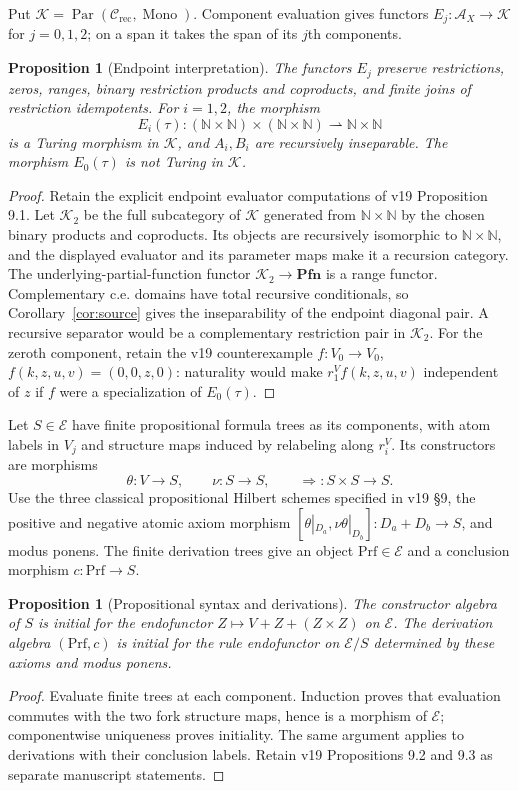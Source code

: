 \documentclass[11pt]{article}
\newtheorem{proposition}[theorem]{Proposition}
\theoremstyle{definition}\newtheorem{definition}[theorem]{Definition}
\newcommand{\N}{\mathbb N}
\newcommand{\Pfn}{\mathbf{Pfn}}
\newcommand{\Par}{\operatorname{Par}}
\newcommand{\A}{\mathcal A}
\newcommand{\E}{\mathcal E}
\begin{document}
Put $\mathcal K=\Par(\mathcal C_{\mathrm{rec}},\operatorname{Mono})$.
Component evaluation gives functors
$E_j:\A_X\to\mathcal K$ for $j=0,1,2$; on a span it takes
the span of its $j$th components.

\begin{proposition}[Endpoint interpretation]\label{prop:fork-endpoints}
The functors $E_j$ preserve restrictions, zeros, ranges, binary
restriction products and coproducts, and finite joins of restriction
idempotents. For $i=1,2$, the morphism
\[
 E_i(\tau):(\N\times\N)\times(\N\times\N)
                  \rightharpoonup\N\times\N
\]
is a Turing morphism in $\mathcal K$, and $A_i,B_i$ are recursively
inseparable. The morphism $E_0(\tau)$ is not Turing in $\mathcal K$.
\end{proposition}
\begin{proof}
Retain the explicit endpoint evaluator computations of v19
Proposition 9.1. Let $\mathcal K_2$ be the full subcategory of
$\mathcal K$ generated from $\N\times\N$ by the chosen binary
products and coproducts. Its objects are recursively isomorphic to
$\N\times\N$, and the displayed evaluator and its parameter maps
make it a recursion category. The underlying-partial-function
functor $\mathcal K_2\to\Pfn$ is a range functor.
Complementary c.e. domains have total recursive conditionals, so
Corollary~\ref{cor:source} gives the inseparability of the endpoint
diagonal pair. A recursive separator would be a complementary
restriction pair in $\mathcal K_2$.
For the zeroth component, retain the v19 counterexample
$f:V_0\to V_0$, $f(k,z,u,v)=(0,0,z,0)$: naturality would make
$r_1^Vf(k,z,u,v)$
independent of $z$ if $f$ were a specialization of $E_0(\tau)$.
\end{proof}

Let $S\in\E$ have finite propositional formula trees as its
components, with atom labels in $V_j$ and structure maps induced
by relabeling along $r_i^V$. Its constructors are morphisms
\[
 \theta:V\to S,\qquad \nu:S\to S,
 \qquad {\Rightarrow}:S\times S\to S.
\]
Use the three classical propositional Hilbert schemes specified in
v19 \S9, the positive and negative atomic axiom morphism
$[\theta|_{D_a},\nu\theta|_{D_b}]:D_a+D_b\to S$, and modus ponens.
The finite derivation trees give an object $\mathrm{Prf}\in\E$
and a conclusion morphism $c:\mathrm{Prf}\to S$.

\begin{proposition}[Propositional syntax and derivations]\label{prop:fork-initiality}
The constructor algebra of $S$ is initial for the endofunctor
$Z\mapsto V+Z+(Z\times Z)$ on $\E$. The derivation algebra
$(\mathrm{Prf},c)$ is initial for the rule endofunctor on $\E/S$
determined by these axioms and modus ponens.
\end{proposition}
\begin{proof}
Evaluate finite trees at each component. Induction proves that
evaluation commutes with the two fork structure maps, hence is a
morphism of $\E$; componentwise uniqueness proves initiality.
The same argument applies to derivations with their conclusion
labels. Retain v19 Propositions 9.2 and 9.3 as separate manuscript
statements.
\end{proof}
\end{document}

